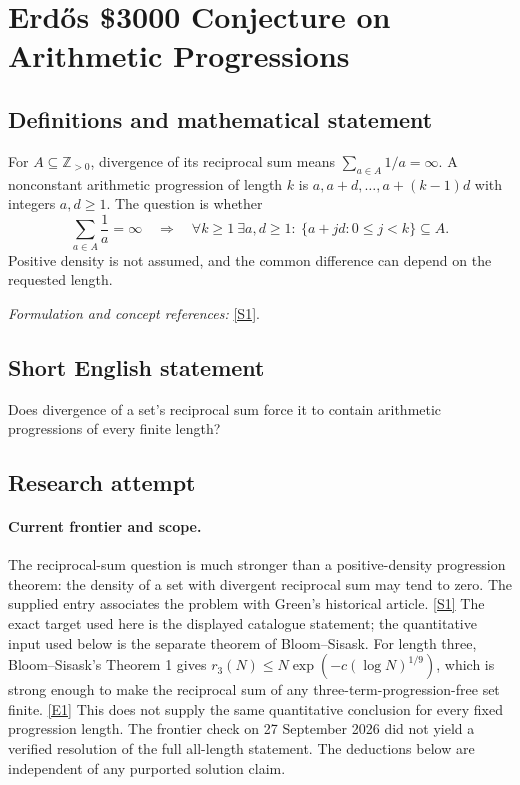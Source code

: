 \documentclass[11pt,a4paper]{article}
\newcommand{\Z}{\mathbb{Z}}
\newcommand{\sref}[2]{\hyperlink{source:#1:#2}{[S#2]}}
\newcommand{\eref}[2]{\hyperlink{extra:#1:#2}{[E#2]}}
\newif\ifshowcatalogue
\newcommand{\cataloguescope}[1]{\ifshowcatalogue
 \paragraph{Exact scope in the supplied catalogue.}
 \begin{quote}\small #1\end{quote}\fi}
\numberwithin{equation}{section}
\begin{document}
\setcounter{section}{0}
\clearpage
\section*{\texorpdfstring{Erdős \$3000 Conjecture on Arithmetic Progressions}{Erdős \$3000 Conjecture on Arithmetic Progressions}}\label{1857}
\subsection{Definitions and mathematical statement}
For $A\subseteq\Z_{>0}$, divergence of its reciprocal sum means $\sum_{a\in A}1/a=\infty$. A nonconstant arithmetic progression of length $k$ is $a,a+d,\ldots,a+(k-1)d$ with integers $a,d\ge1$. The question is whether
\[
 \sum_{a\in A}\frac1a=\infty\quad\Longrightarrow\quad
 \forall k\ge1\ \exists a,d\ge1:\ \{a+jd:0\le j<k\}\subseteq A.
\]
Positive density is not assumed, and the common difference can depend on the requested length.
\par\smallskip\textit{Formulation and concept references:} \sref{1857}{1}.
\cataloguescope{Determine whether every subset A of the natural numbers whose reciprocal sum diverges must contain arbitrarily long arithmetic progressions.}
\subsection{Short English statement}
Does divergence of a set's reciprocal sum force it to contain arithmetic progressions of every finite length?
\subsection{Research attempt}

\paragraph{Current frontier and scope.}
The reciprocal-sum question is much stronger than a positive-density
progression theorem: the density of a set with divergent reciprocal sum
may tend to zero.  The supplied entry associates the problem with
Green's historical article. \sref{1857}{1} The exact target used here is
the displayed catalogue statement; the quantitative input used below
is the separate theorem of Bloom--Sisask.
For length three, Bloom--Sisask's Theorem 1 gives
$r_3(N)\leq N\exp(-c(\log N)^{1/9})$, which is strong enough to make
the reciprocal sum of any three-term-progression-free set finite.
\eref{1857}{1}  This does not supply the same quantitative conclusion
for every fixed progression length.  The frontier check on
27 September 2026 did not yield a verified resolution of the full
all-length statement.  The deductions below are independent of any
purported solution claim.
\end{document}
